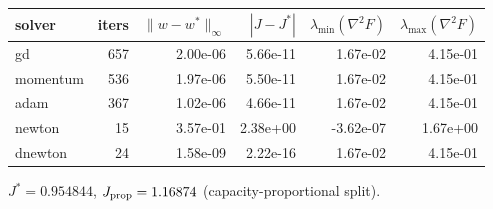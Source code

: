 \begin{tabular}{lrrrrr}\toprule
solver & iters & $\|w-w^*\|_\infty$ & $|J-J^*|$ & $\lambda_{\min}(\nabla^2F)$ & $\lambda_{\max}(\nabla^2F)$ \\\midrule
gd & 657 & 2.00e-06 & 5.66e-11 & 1.67e-02 & 4.15e-01 \\
momentum & 536 & 1.97e-06 & 5.50e-11 & 1.67e-02 & 4.15e-01 \\
adam & 367 & 1.02e-06 & 4.66e-11 & 1.67e-02 & 4.15e-01 \\
newton & 15 & 3.57e-01 & 2.38e+00 & -3.62e-07 & 1.67e+00 \\
dnewton & 24 & 1.58e-09 & 2.22e-16 & 1.67e-02 & 4.15e-01 \\
\bottomrule\end{tabular}

\medskip
\noindent $J^*=0.954844$, \quad $J_{\rm prop}=1.16874$ (capacity-proportional split).
